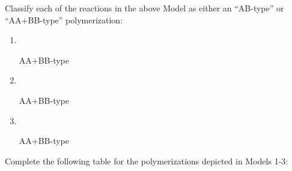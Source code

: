\begin{activity}
\begin{model}
\end{model}

\vspace{0.25in}
\begin{ctqs}

		\question Classify each of the reactions in the above Model as either an ``AB-type'' or ``AA+BB-type'' polymerization:
		
			\begin{enumerate}
				\item ~ \begin{solution}[0.6in]AA+BB-type\end{solution}
				\item ~ \begin{solution}[0.6in]AA+BB-type\end{solution}
				\item ~ \begin{solution}[0.6in]AA+BB-type\end{solution}
			\end{enumerate}
			
		
		\clearpage
		\question Complete the following table for the polymerizations depicted in Models 1-3:
		

\end{ctqs}
\end{activity}
